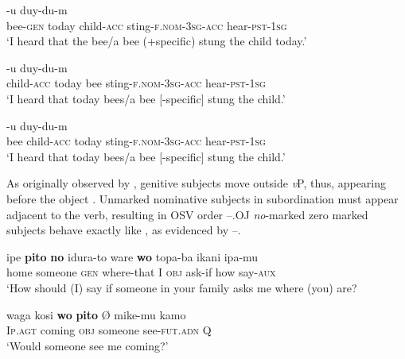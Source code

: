 \documentclass[output=paper]{LSP/langsci}
\begin{document}
\begin{exe}
\ex%
\label{14-ya-ex:21}
\begin{xlist}
\ex \label{14-ya-ex:21a}
-u duy-du-m\\
bee-\textsc{gen} today child-\textsc{acc} sting-\textsc{f}.\textsc{nom}-\textsc{3sg}-\textsc{acc} hear-\textsc{pst}-\textsc{1sg}\\
\glt ‘I heard that the bee/a bee (+specific) stung the child today.’ 

\ex
\label{14-ya-ex:21b}
-u duy-du-m\\
child-\textsc{acc} today bee sting-\textsc{f}.\textsc{nom}-3\textsc{sg}-\textsc{acc} hear-\textsc{pst}-\textsc{1sg}\\
\glt ‘I heard that today bees/a bee [-specific] stung the child.’

\ex
\label{14-ya-ex:21c}
-u duy-du-m\\
bee {} child-\textsc{acc} today sting-\textsc{f}.\textsc{nom}-3\textsc{sg}-\textsc{acc} hear-\textsc{pst}-1\textsc{sg}\\
\glt ‘I heard that today bees/a bee [-specific] stung the child.’
\end{xlist}
\end{exe}

As originally observed by \citet{Kornfilt2003Subject,Kornfilt2008DOM}, genitive subjects move outside \textit{v}P, thus, appearing before the object . Unmarked nominative subjects in subordination must appear adjacent to the verb, resulting in OSV order --.OJ  \textit{no}-marked \vs zero marked subjects behave exactly like , as evidenced by --. 

\begin{exe}
\ex%
\label{14-ya-ex:22}
\begin{xlist}
\ex
\label{14-ya-ex:22a}
\gll ipe \textbf{pito} \textbf{no} idura-to ware \textbf{wo} topa-ba ikani ipa-mu\\ %
home someone \textsc{gen} where-that I \textsc{obj} ask-if how say-\textsc{aux}\\
\glt ‘How should (I) say if someone in your family asks me where (you) are? 

\ex
\label{14-ya-ex:22b}
\gll waga kosi \textbf{wo} \textbf{pito} Ø mike-mu kamo\\ %
I\textsc{p}.\textsc{agt} coming \textsc{obj} someone {} see-\textsc{fut}.\textsc{adn} Q\\
\glt ‘Would someone see me coming?’
\end{xlist}
\end{exe}
\end{document}
